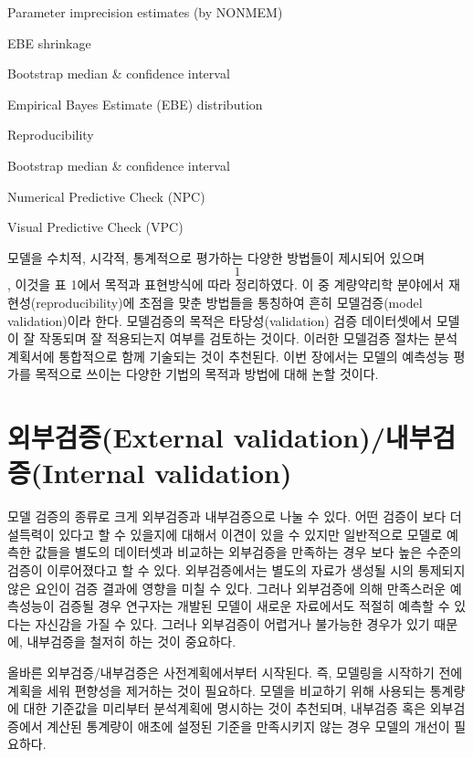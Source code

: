 \documentclass[
  10pt,
]{krantz}
\begin{document}
Parameter imprecision estimates (by NONMEM)

EBE shrinkage

Bootstrap median \& confidence interval

Empirical Bayes Estimate (EBE) distribution

Reproducibility

Bootstrap median \& confidence interval

Numerical Predictive Check (NPC)

Visual Predictive Check (VPC)

모델을 수치적, 시각적, 통계적으로 평가하는 다양한 방법들이 제시되어 있으며 \[1\], 이것을 표 1에서 목적과 표현방식에 따라
정리하였다. 이 중 계량약리학 분야에서 재현성(reproducibility)에 초점을 맞춘 방법들을 통칭하여 흔히
모델검증(model validation)이라 한다. 모델검증의 목적은 타당성(validation) 검증 데이터셋에서
모델이 잘 작동되며 잘 적용되는지 여부를 검토하는 것이다. 이러한 모델검증 절차는 분석계획서에 통합적으로 함께 기술되는 것이
추천된다. 이번 장에서는 모델의 예측성능 평가를 목적으로 쓰이는 다양한 기법의 목적과 방법에 대해 논할 것이다.

\hypertarget{uxc678uxbd80uxac80uxc99dexternal-validationuxb0b4uxbd80uxac80uxc99dinternal-validation}{%
\section{외부검증(External validation)/내부검증(Internal validation)}\label{uxc678uxbd80uxac80uxc99dexternal-validationuxb0b4uxbd80uxac80uxc99dinternal-validation}}

모델 검증의 종류로 크게 외부검증과 내부검증으로 나눌 수 있다. 어떤 검증이 보다 더 설득력이 있다고 할 수 있을지에 대해서
이견이 있을 수 있지만 일반적으로 모델로 예측한 값들을 별도의 데이터셋과 비교하는 외부검증을 만족하는 경우 보다 높은
수준의 검증이 이루어졌다고 할 수 있다. 외부검증에서는 별도의 자료가 생성될 시의 통제되지 않은 요인이 검증 결과에 영향을
미칠 수 있다. 그러나 외부검증에 의해 만족스러운 예측성능이 검증될 경우 연구자는 개발된 모델이 새로운 자료에서도 적절히
예측할 수 있다는 자신감을 가질 수 있다. 그러나 외부검증이 어렵거나 불가능한 경우가 있기 때문에, 내부검증을 철저히 하는
것이 중요하다.

올바른 외부검증/내부검증은 사전계획에서부터 시작된다. 즉, 모델링을 시작하기 전에 계획을 세워 편향성을 제거하는 것이 필요하다.
모델을 비교하기 위해 사용되는 통계량에 대한 기준값을 미리부터 분석계획에 명시하는 것이 추천되며, 내부검증 혹은 외부검증에서
계산된 통계량이 애초에 설정된 기준을 만족시키지 않는 경우 모델의 개선이 필요하다.
\end{document}

